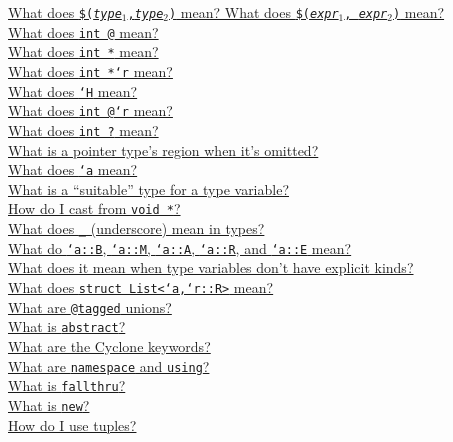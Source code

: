 \ifscreen
\begin{small}
\hyperlink{faq:tuple}{What does \texttt{\$({\it type}$_1$,{\it type}$_2$)} mean?  What does \texttt{\$({\it expr}$_1$, {\it expr}$_2$)} mean?}\\
\hyperlink{faq:non-null}{What does \texttt{int @} mean?}\\
\hyperlink{faq:bounds}{What does \texttt{int *\rb} mean?}\\
\hyperlink{faq:region}{What does \texttt{int *`r} mean?}\\
\hyperlink{faq:heapregion}{What does \texttt{`H} mean?}\\
\hyperlink{faq:boundsregion}{What does \texttt{int @\rb `r} mean?}\\
\hyperlink{faq:questionable}{What does \texttt{int ?} mean?}\\
\hyperlink{faq:omitregion}{What is a pointer type's region when it's omitted?}\\
\hyperlink{faq:typevar}{What does \texttt{`a} mean?}\\
\hyperlink{faq:suitable}{What is a ``suitable'' type for a type variable?}\\
\hyperlink{faq:voidstar}{How do I cast from \texttt{void *}?}\\
\hyperlink{faq:uscore-types}{What does \texttt{_} (underscore) mean in types?}\\
\hyperlink{faq:kinds}{What do \texttt{`a::B}, \texttt{`a::M}, \texttt{`a::A}, \texttt{`a::R}, and \texttt{`a::E} mean?}\\
\hyperlink{faq:nokinds}{What does it mean when type variables don't have explicit kinds?}\\
\hyperlink{faq:list}{What does \texttt{struct List<`a,`r::R>} mean?}\\
\hyperlink{faq:tagged}{What are \texttt{@tagged} unions?}\\
\hyperlink{faq:abstract}{What is \texttt{abstract}?}\\
\hyperlink{faq:keywords}{What are the Cyclone keywords?}\\
\hyperlink{faq:namespace}{What are \texttt{namespace} and \texttt{using}?}\\
\hyperlink{faq:fallthru}{What is \texttt{fallthru}?}\\
\hyperlink{faq:new}{What is \texttt{new}?}\\
\hyperlink{faq:usetuples}{How do I use tuples?}\\

\end{small}
